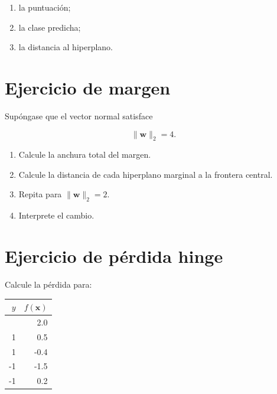 \documentclass[
  spanish,
  10.5pt,
  letterpaper,
  DIV=11,
  numbers=noendperiod,
  oneside,
  open=any]{scrreprt}
\newcounter{none} %
\providecommand{\tightlist}{%
  \setlength{\itemsep}{0pt}\setlength{\parskip}{0pt}}
\theoremstyle{definition}
\theoremstyle{definition}
\theoremstyle{plain}
\theoremstyle{remark}
\begin{document}
\begin{enumerate}
\def\labelenumi{\arabic{enumi}.}
\tightlist
\item
  la puntuación;
\item
  la clase predicha;
\item
  la distancia al hiperplano.
\end{enumerate}

\section*{Ejercicio de margen}\label{ejercicio-de-margen}


Supóngase que el vector normal satisface

\[
\|\mathbf{w}\|_2=4.
\]

\begin{enumerate}
\def\labelenumi{\arabic{enumi}.}
\tightlist
\item
  Calcule la anchura total del margen.
\item
  Calcule la distancia de cada hiperplano marginal a la frontera
  central.
\item
  Repita para \(\|\mathbf{w}\|_2=2\).
\item
  Interprete el cambio.
\end{enumerate}

\section*{Ejercicio de pérdida
hinge}\label{ejercicio-de-puxe9rdida-hinge}


Calcule la pérdida para:

{\def\LTcaptype{none} %
\begin{longtable}[]{@{}rr@{}}
\toprule\noalign{}
\(y\) & \(f(\mathbf{x})\) \\
\midrule\noalign{}
\endhead
\bottomrule\noalign{}
\endlastfoot
1 & 2.0 \\
1 & 0.5 \\
1 & -0.4 \\
-1 & -1.5 \\
-1 & 0.2 \\
\end{longtable}
}
\end{document}
